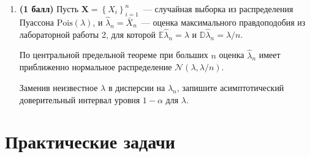 \documentclass[a4paper,12pt]{article}
\newcommand{\pts}[1]{\textbf{(#1)}}
\begin{document}
\begin{enumerate}
  Какой объем выборки нужен, чтобы при $\sigma=2$ и $\alpha=0.05$ половина длины доверительного интервала была не больше $0.1$?

  \item \pts{1 балл} Пусть $\mathbf{X}=\left\{X_i\right\}_{i=1}^n$~--- случайная выборка из распределения Пуассона $\mathrm{Pois}(\lambda)$, и $\hat\lambda_n=\bar X_n$~--- оценка максимального правдоподобия из лабораторной работы 2, для которой $\mathbb{E}\hat\lambda_n=\lambda$ и $\mathbb{D}\hat\lambda_n=\lambda/n$.

  По центральной предельной теореме при больших $n$ оценка $\hat\lambda_n$ имеет приближенно нормальное распределение $\mathcal{N}(\lambda,\lambda/n)$.

  Заменив неизвестное $\lambda$ в дисперсии на $\hat\lambda_n$, запишите асимптотический доверительный интервал уровня $1-\alpha$ для $\lambda$.

\end{enumerate}

\section*{Практические задачи}
\end{document}
